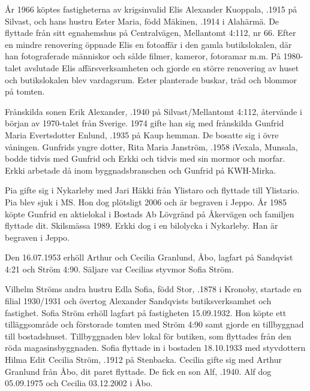 År 1966 köptes fastigheterna av krigsinvalid Elis Alexander Kuoppala,	.1915 på Silvast, och hans hustru Ester Maria, född Mäkinen, .1914 i	Alahärmä.  De flyttade från sitt egnahemshus på Centralvägen, Mellantomt 4:112, nr 66. Efter en mindre renovering öppnade Elis en fotoaffär i den gamla butikslokalen, där han fotograferade människor och sålde filmer, kameror, fotoramar m.m. På 1980-talet avslutade Elis affärsverksamheten och gjorde en större renovering av huset och butikslokalen blev vardagsrum. Ester planterade buskar, träd och blommor på tomten.

Frånskilda sonen Erik Alexander, .1940 på Silvast/Mellantomt 4:112, återvände i början av 1970-talet från Sverige. 1974 gifte han sig med frånskilda Gunfrid Maria Evertsdotter Enlund, .1935 på Kaup hemman. De bosatte sig i övre våningen. Gunfrids yngre dotter, Rita Maria Janström, .1958 iVexala, Munsala, bodde tidvis med Gunfrid och Erkki och tidvis med sin mormor och morfar. Erkki arbetade då inom byggnadsbranschen och Gunfrid på KWH-Mirka.
\begin{jhchildren}
  \item {}
\end{jhchildren}
Pia gifte sig i Nykarleby med Jari Häkki från Ylistaro och flyttade till Ylistario. Pia blev sjuk i MS. Hon dog plötsligt 2006 och är begraven i Jeppo. År 1985 köpte Gunfrid en aktielokal i Bostads Ab Lövgränd på Åkervägen och familjen flyttade dit. Skilsmässa 1989. Erkki dog i en bilolycka i Nykarleby. Han är begraven i Jeppo.


Den 16.07.1953 erhöll Arthur och Cecilia Granlund, Åbo, lagfart	på Sandqvist 4:21 och Ström 4:90. Säljare var Cecilias styvmor Sofia Ström.\jhvspace{}


Vilhelm Ströms andra hustru Edla Sofia, född Stor, .1878 i Kronoby, startade en filial 1930/1931 och övertog Alexander Sandqvists butiksverksamhet och fastighet. Sofia Ström erhöll lagfart på fastigheten 15.09.1932. Hon köpte ett tilläggsområde och förstorade tomten med Ström 4:90 samt gjorde en tillbyggnad till bostadshuset. Tillbyggnaden blev lokal för butiken, som flyttades från den röda magasinsbyggnaden. Sofia flyttade in i bostaden 18.10.1933 med styvdottern Hilma Edit Cecilia Ström, .1912 på Stenbacka. Cecilia gifte sig med Arthur Granlund från Åbo, dit paret flyttade. De fick en son Alf, .1940. Alf dog 05.09.1975 och Cecilia 03.12.2002 i Åbo.


